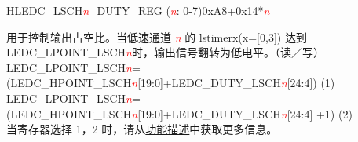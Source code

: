 \begin{register}{H}{LEDC\_LSCH\textit{\textcolor{red}{\it{n}}}\_DUTY\_REG (\textit{\textcolor{red}{\it{n}}}: 0-7)}{0xA8+0x14*\textit{\textcolor{red}{\it{n}}}}\label{regdesc:LEDCLSCHnDUTYREG}
%
%
\regnewline%
\begin{regdesc}\begin{reglist}
\item [LEDC\_DUTY\_LSCH\textcolor{red}{\it{n}}]\label{regdesc:LEDCDUTYLSCHn} 用于控制输出占空比。当低速通道 \textcolor{red}{\it{n}} 的 lstimerx(x=[0,3]) 达到 LEDC\_LPOINT\_LSCH\textcolor{red}{\it{n}}时，输出信号翻转为低电平。（读／写）\\
LEDC\_LPOINT\_LSCH\textcolor{red}{\it{n}}=(LEDC\_HPOINT\_LSCH\textcolor{red}{\it{n}}[19:0]+LEDC\_DUTY\_LSCH\textcolor{red}{\it{n}}[24:4])          (1) \\
LEDC\_LPOINT\_LSCH\textcolor{red}{\it{n}}=(LEDC\_HPOINT\_LSCH\textcolor{red}{\it{n}}[19:0]+LEDC\_DUTY\_LSCH\textcolor{red}{\it{n}}[24:4] +1)     (2) \\
当寄存器选择 1，2 时，请从\hyperref[ledcfd:dithering]{功能描述}中获取更多信息。
\end{reglist}\end{regdesc}
\end{register}


